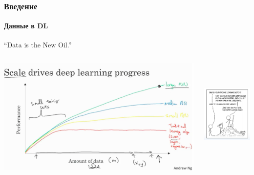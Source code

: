 \documentclass[10pt]{beamer}
\begin{document}
\begin{frame}
\frametitle{Введение}
\framesubtitle{Данные в DL}

\begin{exampleblock}{}
  {\large “Data is the New Oil.”}
  \vskip1mm
  \hspace*{}
\end{exampleblock}

\begin{columns}
    \begin{column}{0.5\textwidth}
        \begin{center}
            \includegraphics[width=\textwidth]{images/dl_tradeoff.png}
        \end{center}
    \end{column}
    \vline
    \begin{column}{0.5\textwidth}
        \begin{center}
            \includegraphics[height=5.5cm]{images/dl_data_joke.png}
        \end{center}
    \end{column}
\end{columns}

\end{frame}
\end{document}
